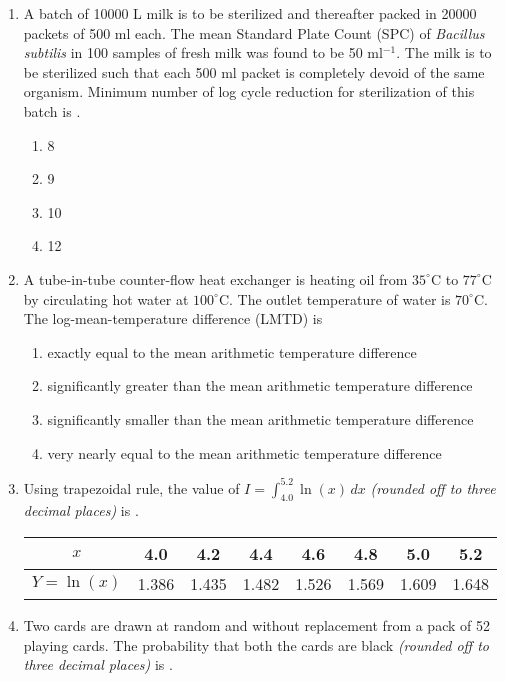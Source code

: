 \documentclass[12pt]{article}
\begin{document}
\begin{enumerate}[label=Q.\arabic*]
		\item A batch of 10000 L milk is to be sterilized and thereafter packed in 20000 packets of 500 ml each. The mean Standard Plate Count (SPC) of \textit{Bacillus subtilis} in 100 samples of fresh milk was found to be 50 ml$^{-1}$. The milk is to be sterilized such that each 500 ml packet is completely devoid of the same organism. Minimum number of log cycle reduction for sterilization of this batch is \underline{\hspace{2cm}}.
			\begin{multicols}{4}
				\begin{enumerate}[label=(\Alph*)]
					\item 8
					\item 9
					\item 10
					\item 12
				\end{enumerate}
			\end{multicols}
		\item A tube-in-tube counter-flow heat exchanger is heating oil from $35^\circ$C to $77^\circ$C by circulating hot water at $100^\circ$C. The outlet temperature of water is $70^\circ$C. The log-mean-temperature difference (LMTD) is
			\begin{enumerate}[label=(\Alph*)]
				\item exactly equal to the mean arithmetic temperature difference
				\item significantly greater than the mean arithmetic temperature difference
				\item significantly smaller than the mean arithmetic temperature difference
				\item very nearly equal to the mean arithmetic temperature difference
			\end{enumerate}

		\item Using trapezoidal rule, the value of $I = \int_{4.0}^{5.2} \ln(x)\, dx$ \textit{(rounded off to three decimal places)} is \underline{\hspace{2cm}}.

			\begin{center}
				\begin{tabular}{|c|c|c|c|c|c|c|c|}
					\hline
					$x$ & 4.0 & 4.2 & 4.4 & 4.6 & 4.8 & 5.0 & 5.2 \\
					\hline
					$Y = \ln(x)$ & 1.386 & 1.435 & 1.482 & 1.526 & 1.569 & 1.609 & 1.648 \\
					\hline
				\end{tabular}
			\end{center}
			\vspace{2pt}
		\item Two cards are drawn at random and without replacement from a pack of 52 playing cards. The probability that both the cards are black \textit{(rounded off to three decimal places)} is \underline{\hspace{2cm}}.


\end{enumerate}
\end{document}
